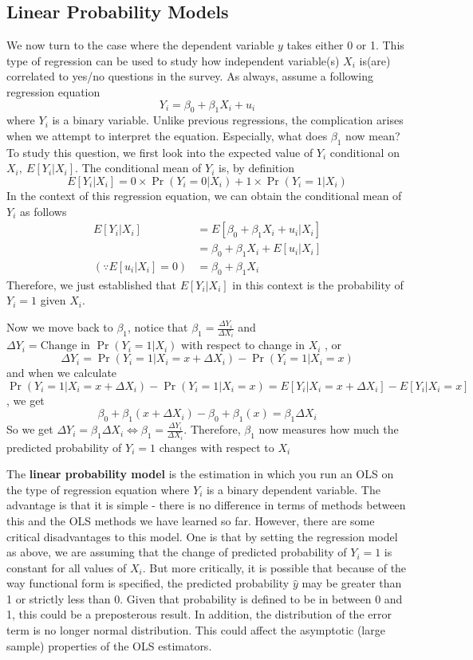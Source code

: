 \documentclass[12pt]{article}
\theoremstyle{definition}
\theoremstyle{property}
\theoremstyle{assumption}
\theoremstyle{example}
\theoremstyle{comment}
\begin{document}
\subsection{Linear Probability Models}
We now turn to the case where the dependent variable $y$ takes either 0 or 1. This type of regression can be used to study how independent variable(s) $X_i$ is(are) correlated to yes/no questions in the survey. As always, assume a following regression equation
\[
Y_i = \beta_0 + \beta_1 X_i +u_i
\]
where $Y_i$ is a binary variable.  Unlike previous regressions, the complication arises when we attempt to interpret the equation. Especially, what does $\beta_1$ now mean? To study this question, we first look into the expected value of $Y_i$ conditional on $X_i,\ E[Y_i|X_i]$. The conditional mean of $Y_i$ is, by definition
\[
E[Y_i|X_i] = 0\times\Pr(Y_i=0|X_i)+1\times\Pr(Y_i=1|X_i)
\]
In the context of this regression equation, we can obtain the conditional mean of $Y_i$ as follows
\[
\begin{aligned}
E[Y_i|X_i]&=E[\beta_0+\beta_1X_i+u_i|X_i]\\
&=\beta_0 + \beta_1X_i + E[u_i|X_i]\\
(\because  E[u_i|X_i]=0)&=\beta_0 + \beta_1X_i 
\end{aligned}
\]
Therefore, we just established that $E[Y_i|X_i]$ in this context is the probability of $Y_i=1$ given $X_i$. \par\medskip
Now we move back to $\beta_1$, notice that $\beta_1 =\frac{\Delta Y_i}{\Delta X_i}$ and $\Delta Y_i = \text{Change in }\Pr(Y_i=1|X_i)$ with respect to change in $X_i$ , or
\[
\Delta Y_i = \Pr(Y_i=1|X_i=x+\Delta X_i)-\Pr(Y_i=1|X_i=x)
\]
and when we calculate $\Pr(Y_i=1|X_i=x+\Delta X_i)-\Pr(Y_i=1|X_i=x)=E[Y_i|X_i=x+\Delta X_i]-E[Y_i|X_i=x]$, we get
\[
\beta_0+\beta_1(x+\Delta X_i)-\beta_0+\beta_1(x) =\beta_1 \Delta X_i
\]
So we get $\Delta Y_i = \beta_1\Delta X_i\iff\beta_1 =\frac{\Delta Y_i}{\Delta X_i}$. Therefore, $\beta_1$ now measures how much the predicted probability of $Y_i=1$ changes with respect to $X_i$ \par\medskip
The \textbf{linear probability model} is the estimation in which you run an OLS on the type of regression equation where $Y_i$ is a binary dependent variable. The advantage is that it is simple - there is no difference in terms of methods between this and the OLS methods we have learned so far. However, there are some critical disadvantages to this model. One is that by setting the regression model as above, we are assuming that the change of predicted probability of $Y_i=1$ is constant for all values of $X_i$. But more critically, it is possible that because of the way functional form is specified, the predicted probability $\hat{y}$ may be greater than 1 or strictly less than 0. Given that probability is defined to be in between 0 and 1, this could be a preposterous result. In addition, the distribution of the error term is no longer normal distribution. This could affect the asymptotic (large sample) properties of the OLS estimators. \par\medskip
\end{document}

